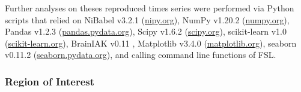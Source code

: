 %
Further analyses on theses reproduced times series were performed via Python
scripts that relied on
%
NiBabel v3.2.1 (\href{https://nipy.org}{\url{nipy.org}}),
%
NumPy v1.20.2 (\href{https://numpy.org}{\url{numpy.org}}),
%
Pandas v1.2.3 (\href{https://pandas.pydata.org}{\url{pandas.pydata.org}}),
%
Scipy v1.6.2 (\href{https://scipy.org}{\url{scipy.org}}),
%
scikit-learn v1.0 (\href{https://scikit-learn.org}{\url{scikit-learn.org}}),
%
BrainIAK v0.11
\citep[\href{https://brainiak.org}{\url{brainiak.org}}][]{kumar2020brainiak,
kumar2020brainiaktutorial},
%
Matplotlib v3.4.0 (\href{https://matplotlib.org}{\url{matplotlib.org}}),
%
seaborn v0.11.2 (\href{https://seaborn.pydata.org}{\url{seaborn.pydata.org}}),
%
and calling command line functions of FSL.








\subsubsection{Region of Interest}




